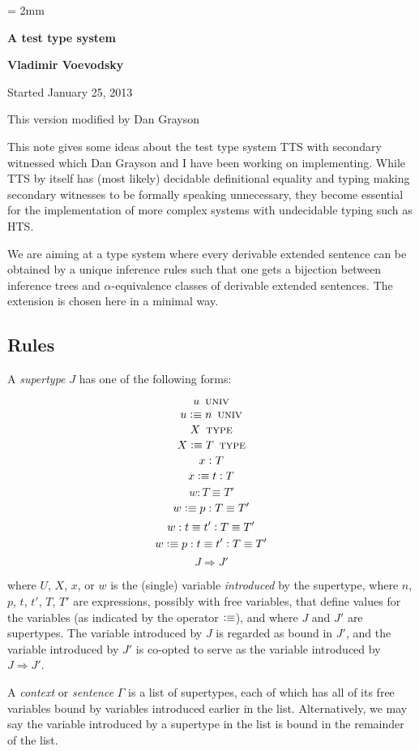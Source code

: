 \documentclass[11pt]{article}
\newcommand{\eqd}{\equiv}
\newcommand{\ccolon}{\vcentcolon}
\newcommand{\Univ}{\mathop{\text{ \sc univ}}}
\newcommand{\Type}{\mathop{\text{ \sc type}}}
\newcommand{\defn}{\vcentcolon\equiv}
\begin{document}
\parskip = 2mm
\begin{center}
{\bf\Large A test type system}

{\bf Vladimir Voevodsky}

{Started January 25, 2013}  

{This version modified by Dan Grayson}  
\end{center}

\tableofcontents

This note gives some ideas about the test type system TTS with secondary
witnessed which Dan Grayson and I have been working on implementing. While TTS
by itself has (most likely) decidable definitional equality and typing making
secondary witnesses to be formally speaking unnecessary, they become essential
for the implementation of more complex systems with undecidable typing such as
HTS.

We are aiming at a type system where every derivable extended sentence can be
obtained by a unique inference rules such that one gets a bijection between
inference trees and $\alpha$-equivalence classes of derivable extended
sentences.  The extension is chosen here in a minimal way.

\subsection{Rules}

A {\em supertype} $J$ has one of the following forms:

$$ u \Univ $$
$$ u \defn n \Univ $$
$$ X \Type $$
$$ X \defn T \Type $$
$$ x \ccolon T $$
$$ x \defn t \ccolon T $$
$$ w : T \eqd T' $$
$$ w \defn p : T \eqd T' $$
$$ w : t \eqd t' \ccolon T \eqd T' $$
$$ w \defn p : t \eqd t' \ccolon T \eqd T' $$
$$ J \Rightarrow J' $$

where $U$, $X$, $x$, or $w$ is the (single) variable {\em introduced} by the
supertype, where $n$, $p$, $t$, $t'$, $T$, $T'$ are expressions, possibly with
free variables, that define values for the variables (as indicated by the
operator $\defn$), and where $J$ and $J'$ are supertypes.  The variable
introduced by $J$ is regarded as bound in $J'$, and the variable introduced by
$J'$ is co-opted to serve as the variable introduced by $ J \Rightarrow J' $.

A {\em context} or {\em sentence} $\Gamma$ is a list of supertypes, each of
which has all of its free variables bound by variables introduced earlier in
the list.  Alternatively, we may say the variable introduced by a supertype in
the list is bound in the remainder of the list.
\end{document}
